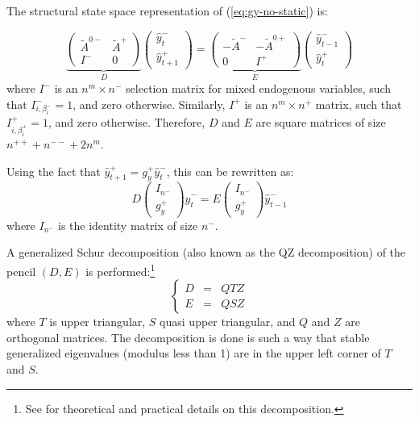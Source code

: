 \documentclass[11pt,a4paper]{article}
\begin{document}
The structural state space representation of (\ref{eq:gy-no-static}) is:

\begin{equation*}
  \underbrace{
    \left(
      \begin{matrix}
        \tilde{A}^{0-} & \tilde{A}^+ \\
        I^- & 0
      \end{matrix}
    \right)
  }_D
  \left(
    \begin{matrix}
      \hat{y}^-_t \\
      \hat{y}^+_{t+1}
    \end{matrix}
  \right)
  =
  \underbrace{
    \left(
      \begin{matrix}
        -\tilde{A}^- & -\tilde{A}^{0+} \\
        0 & I^+
      \end{matrix}
    \right)
  }_E
  \left(
    \begin{matrix}
      \hat{y}^-_{t-1} \\
      \hat{y}^+_t
    \end{matrix}
  \right)
\end{equation*}
where $I^-$ is an $n^m \times n^-$ selection matrix for mixed endogenous
variables, such that $I^-_{i,\beta^-_i}=1$, and zero otherwise. Similarly,
$I^+$ is an $n^m \times n^+$ matrix, such that $I^+_{i,\beta^+_i}=1$, and zero
otherwise. Therefore, $D$ and $E$ are square matrices of size
$n^{++}+n^{--}+2n^m$.

Using the fact that $\hat{y}^+_{t+1} = g^+_y \hat{y}^-_t$, this can be
rewritten as:
\begin{equation}
  \label{eq:state-space}
  D
  \left(
    \begin{matrix}
      I_{n^-} \\
      g^+_y
    \end{matrix}
  \right)
  \hat{y}^-_t
  =
  E
  \left(
    \begin{matrix}
      I_{n^-} \\
      g^+_y
    \end{matrix}
  \right)
  \hat{y}^-_{t-1}
\end{equation}
where $I_{n^-}$ is the identity matrix of size $n^-$.

A generalized Schur decomposition (also known as the QZ decomposition) of the
pencil $(D,E)$ is performed:\footnote{See \citet[section
  7.7]{golub/van-loan:1996} for theoretical and practical details on this
  decomposition.}
\begin{equation*}
  \left\{\begin{array}{rcl}
      D & = & QTZ \\
      E & = & QSZ
    \end{array}
  \right.
\end{equation*}
where $T$ is upper triangular, $S$ quasi upper triangular, and $Q$ and $Z$ are
orthogonal matrices. The decomposition is done is such a way that stable
generalized eigenvalues (modulus less than 1) are in the upper left corner of
$T$ and $S$.
\end{document}

